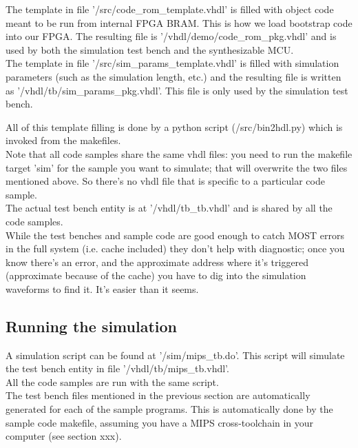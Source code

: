 \documentclass[11pt]{article}
\begin{document}
    The template in file '/src/code\_rom\_template.vhdl' is filled with object
    code meant to be run from internal FPGA BRAM. This is how we load bootstrap
    code into our FPGA. The resulting file is '/vhdl/demo/code\_rom\_pkg.vhdl'
    and is used by both the simulation test bench and the synthesizable MCU.\\
    
    The template in file '/src/sim\_params\_template.vhdl' is filled with 
    simulation parameters (such as the simulation length, etc.) and the resulting 
    file is written as '/vhdl/tb/sim\_params\_pkg.vhdl'. This file is only used
    by the simulation test bench.
    
    All of this template filling is done by a python script (/src/bin2hdl.py) 
    which is invoked from the makefiles.\\
    
    Note that all code samples share the same vhdl files: you need to run the 
    makefile target 'sim' for the sample you want to simulate; that will 
    overwrite the two files mentioned above. So there's no vhdl file that is
    specific to a particular code sample.\\
    
    The actual test bench entity is at '/vhdl/tb\_tb.vhdl' and is shared by all
    the code samples.\\
    
    While the test benches and sample code are good enough to catch MOST errors
    in the full system (i.e. cache included) they don't help with diagnostic;
    once you know there's an error, and the approximate address where it's
    triggered (approximate because of the cache) you have to dig into the 
    simulation waveforms to find it. It's easier than it seems.\\
    
\subsection{Running the simulation}
\label{running_the_simulation}

    A simulation script can be found at '/sim/mips\_tb.do'. This script will
    simulate the test bench entity in file '/vhdl/tb/mips\_tb.vhdl'.\\
    
    All the code samples are run with the same script.\\

    The test bench files mentioned in the previous section are automatically 
    generated for each of the sample programs. This is automatically done by the 
    sample code makefile,
    assuming you have a MIPS cross-toolchain in your computer (see section xxx).\\
\end{document}
